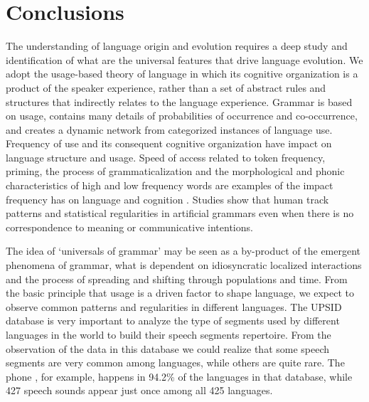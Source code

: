 \chapter{Conclusions}

The understanding of language origin and evolution requires a deep study
and identification of what are the universal features that drive language evolution.
We adopt the usage-based theory of language in which its cognitive organization
is a product of the speaker experience, rather than a set of abstract rules and structures
that indirectly relates to the language experience. Grammar is based on usage, contains
many details of probabilities of occurrence and co-occurrence, and creates a dynamic network
from categorized instances of language use.
Frequency of use and its consequent cognitive organization have impact on language 
structure and usage. Speed of access related to token frequency, priming, the process 
of grammaticalization and the morphological and phonic characteristics of high and low frequency
words are examples of the impact frequency has on language and cognition \citep{bybee2001,bybee2003,bybee2007frequency,ellis2002}.
Studies \citep{saffran1996b,Saffran1999,Saffran2003} show that human track patterns and statistical regularities in artificial
grammars even when there is no correspondence to meaning or communicative intentions.

The idea of `universals of grammar' may be seen as a by-product of the emergent phenomena
of grammar, what is dependent on idiosyncratic localized interactions and the
process of spreading and shifting through populations and time.
From the basic principle that usage is a driven factor to shape language, we 
expect to observe common patterns and regularities in different languages.
The UPSID database is very important to analyze the type of segments used by different
languages in the world to build their speech segments repertoire. From the observation
of the data in this database we could realize that some speech segments are very
common among languages, while others are quite rare. The phone \textipa{[m]}, for example,
happens in 94.2\% of the languages in that database, while 427 speech sounds appear just once
among all 425 languages.

